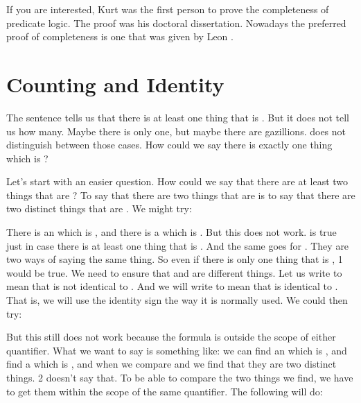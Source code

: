 If you are interested, Kurt \citet{Godel1929} was the first person to prove the 
completeness of predicate logic. The proof was his doctoral dissertation.  
Nowadays the preferred proof of completeness is one that was given by Leon 
\citet{Henkin1949}.  




\section{Counting and Identity}\label{secIdentity}

The sentence  tells us that there is at least one thing that  
is . But it does not tell us how many. Maybe there is only one, but maybe 
there are gazillions.  does not distinguish between those 
cases. How could we say there is exactly one thing which is ?


Let's start with an easier question. How could we say that there are at least 
two things that are ? To say that there are two things that are  is to 
say that there are two distinct things that are . We might try:


\begin{argument}
 \aitem {}
\end{argument}

There is an  which is , and  there is a  which is . But this 
does not work.  is true just in case there is at least one 
thing that is . And the same goes for . They are two ways 
of saying the same thing. So even if there is only one thing that is , 1 
would be true. We need to ensure that  and  are different things.  Let 
us write  to mean that  is not identical to .  And we 
will write  to mean that  is identical to . That is, 
we will use the identity sign the way it is normally used. We could then try:
\begin{argument}
 \aitem {}

\end{argument}

But this still does not work because the formula  is outside 
the scope of either quantifier. What we want to say is something like: we can 
find an  which is , and find a  which is , and when we 
compare  and  we find that they are two distinct things. 2 doesn't say 
that.  To be able to compare the two things we find, we have to get them within 
the scope of the same quantifier. The following will do:

